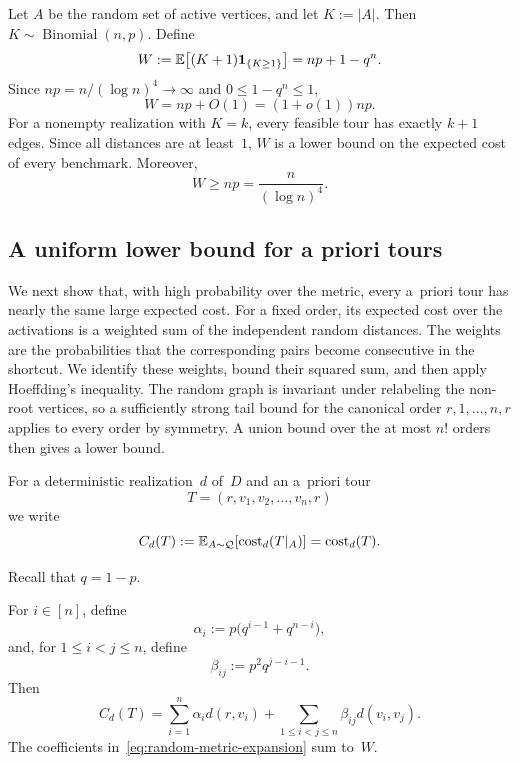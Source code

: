 \documentclass[12pt,a4paper,oneside]{report}
\begin{document}
Let $A$ be the random set of active vertices, and let $K:=|A|$.  Then
$K\sim\operatorname{Binomial}(n,p)$.
Define
\begin{equation}\label{eq:random-metric-baseline}
    W
    :=
    \mathbb{E}\bigl[(K+1)\mathbf{1}_{\{K\ge1\}}\bigr]
    =
    np+1-q^n.
\end{equation}
Since $np=n/(\log n)^4\to\infty$ and $0\le1-q^n\le1$,
\[
    W=np+O(1)=(1+o(1))np.
\]
For a nonempty realization with $K=k$, every feasible tour has exactly
$k+1$ edges.  Since all distances are at least~$1$, $W$ is a
lower bound on the expected cost of every benchmark.  Moreover,
\begin{equation}\label{eq:random-metric-baseline-lower-bound}
    W\ge np=\frac{n}{(\log n)^4}.
\end{equation}

\subsection{A uniform lower bound for a priori tours}
\label{sec:random-metric-prior-bound}

We next show that, with high probability over the metric, every a~priori tour
has nearly the same large expected cost.  For a fixed order, its expected cost
over the activations is a weighted sum of the independent random distances.
The weights are the probabilities that the corresponding pairs become
consecutive in the shortcut.  We identify these weights, bound their squared
sum, and then apply Hoeffding's inequality.  The random graph is invariant
under relabeling the non-root vertices, so a sufficiently strong tail bound for
the canonical order $r,1,\ldots,n,r$ applies to every order by symmetry.  A
union bound over the at most $n!$ orders then gives a lower bound.

For a deterministic realization~$d$ of~$D$ and an a~priori tour
\[
    T=(r,v_1,v_2,\ldots,v_n,r)
\]
we write
\[
    C_d(T):=\mathbb{E}_{A\sim\mathcal Q}[\operatorname{cost}_d(T|_A)]=\operatorname{cost}_d(T).
\]

Recall that $q=1-p$.

\begin{lemma}\label{lem:random-metric-expansion}
For $i\in[n]$, define
\[
    \alpha_i:=p\bigl(q^{i-1}+q^{n-i}\bigr),
\]
and, for $1\le i<j\le n$, define
\[
    \beta_{ij}:=p^2q^{j-i-1}.
\]
Then
\begin{equation}\label{eq:random-metric-expansion}
    C_d(T)
    =
    \sum_{i=1}^n\alpha_i d(r,v_i)
    +
    \sum_{1\le i<j\le n}\beta_{ij}d(v_i,v_j).
\end{equation}
The coefficients in~\cref{eq:random-metric-expansion} sum to~$W$.
\end{lemma}
\end{document}
